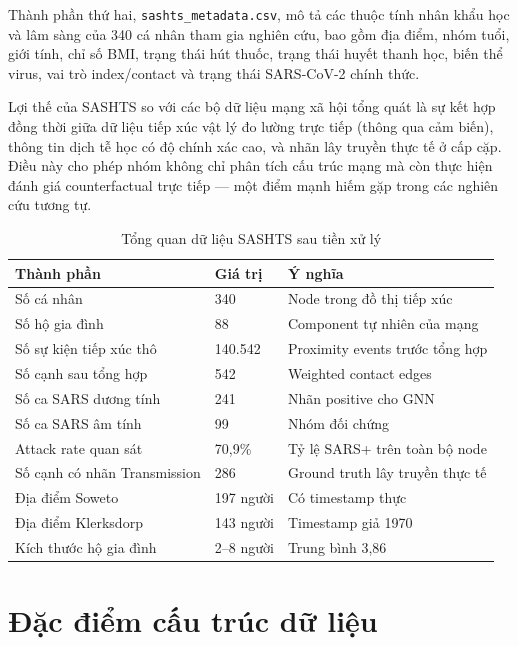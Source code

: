 \documentclass[12pt,a4paper]{report}
\theoremstyle{definition}
\begin{document}
Thành phần thứ hai, \texttt{sashts\_metadata.csv}, mô tả các thuộc tính nhân khẩu học và lâm sàng của 340 cá nhân tham gia nghiên cứu, bao gồm địa điểm, nhóm tuổi, giới tính, chỉ số BMI, trạng thái hút thuốc, trạng thái huyết thanh học, biến thể virus, vai trò index/contact và trạng thái SARS-CoV-2 chính thức.

Lợi thế của SASHTS so với các bộ dữ liệu mạng xã hội tổng quát là sự kết hợp đồng thời giữa dữ liệu tiếp xúc vật lý đo lường trực tiếp (thông qua cảm biến), thông tin dịch tễ học có độ chính xác cao, và nhãn lây truyền thực tế ở cấp cặp. Điều này cho phép nhóm không chỉ phân tích cấu trúc mạng mà còn thực hiện đánh giá counterfactual trực tiếp --- một điểm mạnh hiếm gặp trong các nghiên cứu tương tự.

\begin{table}[H]
\centering
\caption{Tổng quan dữ liệu SASHTS sau tiền xử lý}
\label{tab:sashts_overview}
\begin{tabular}{L{6.5cm} C{3.5cm} L{5cm}}
\toprule
\textbf{Thành phần} & \textbf{Giá trị} & \textbf{Ý nghĩa}\\
\midrule
Số cá nhân                     & 340     & Node trong đồ thị tiếp xúc\\
Số hộ gia đình                 & 88      & Component tự nhiên của mạng\\
Số sự kiện tiếp xúc thô        & 140.542 & Proximity events trước tổng hợp\\
Số cạnh sau tổng hợp           & 542     & Weighted contact edges\\
Số ca SARS dương tính          & 241     & Nhãn positive cho GNN\\
Số ca SARS âm tính             & 99      & Nhóm đối chứng\\
Attack rate quan sát           & 70,9\%  & Tỷ lệ SARS+ trên toàn bộ node\\
Số cạnh có nhãn Transmission   & 286     & Ground truth lây truyền thực tế\\
Địa điểm Soweto                & 197 người & Có timestamp thực\\
Địa điểm Klerksdorp            & 143 người & Timestamp giả 1970\\
Kích thước hộ gia đình         & 2--8 người & Trung bình 3,86\\
\bottomrule
\end{tabular}
\end{table}

\section{Đặc điểm cấu trúc dữ liệu}
\end{document}
